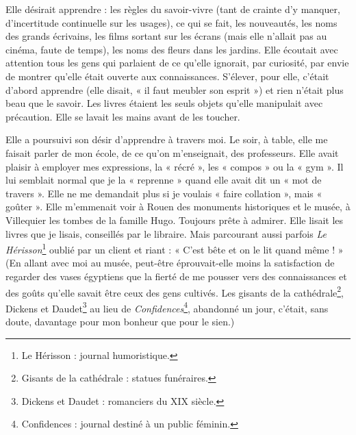 	{
	
	Elle désirait apprendre : les règles du savoir-vivre (tant de crainte d’y manquer, d’incertitude continuelle sur les usages), ce qui se fait, les nouveautés, les noms des grands écrivains, les films sortant sur les écrans (mais elle n’allait pas au cinéma, faute de temps), les noms des fleurs dans les jardins. Elle écoutait avec attention tous les gens qui parlaient de ce qu’elle ignorait, par curiosité, par envie de montrer qu’elle était ouverte aux connaissances. S’élever, pour elle, c’était d’abord apprendre (elle disait, « il faut meubler son esprit ») et rien n’était plus beau que le savoir. Les livres étaient les seuls objets qu’elle manipulait avec précaution. Elle se lavait les mains avant de les toucher.
	
Elle a poursuivi son désir d’apprendre à travers moi. Le soir, à table, elle me faisait parler de mon école, de ce qu’on m’enseignait, des professeurs. Elle avait plaisir à employer mes expressions, la « récré », les « compos » ou la « gym ». Il lui semblait normal que je la « reprenne » quand elle avait dit un « mot de travers ». Elle ne me demandait plus si je voulais « faire collation », mais « goûter ». Elle m’emmenait voir à Rouen des monuments historiques et le musée, à Villequier les tombes de la famille Hugo. Toujours prête à admirer. Elle lisait les livres que je lisais, conseillés par le libraire. Mais parcourant aussi parfois \emph{Le Hérisson}\footnote{Le Hérisson : journal humoristique.} oublié par un client et riant : « C’est bête et on le lit quand même ! » (En allant avec moi au musée, peut-être éprouvait-elle moins la satisfaction de regarder des vases égyptiens que la fierté de me pousser vers des connaissances et des goûts qu’elle savait être ceux des gens cultivés. Les gisants de la cathédrale\footnote{Gisants de la cathédrale : statues funéraires.}, Dickens et Daudet\footnote{Dickens et Daudet : romanciers du XIX\ieme{} siècle.} au lieu de \emph{Confidences}\footnote{Confidences : journal destiné à un public féminin.}, abandonné un jour, c’était, sans doute, davantage pour mon bonheur que pour le sien.)

}
